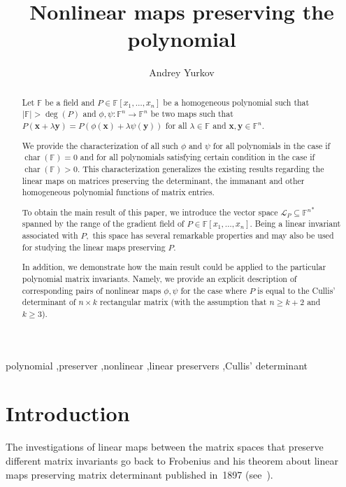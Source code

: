 \documentclass{elsarticle}
\DeclareMathOperator{\Char}{char}
\def\F{{\mathbb F}}
\theoremstyle{definition}
\numberwithin{equation}{section}
\begin{document}
\title{Nonlinear maps preserving the polynomial}
\author[1]{Andrey Yurkov}



%
\begin{abstract}
Let $\F$ be a field and $P \in \F[x_1,\ldots, x_n]$ be a homogeneous polynomial such that $|\F| > \deg(P)$ and $\phi, \psi\colon \F^n \to \F^n$ be two maps such that $P(\mathbf{x} + \lambda\mathbf{y}) = P(\phi(\mathbf{x}) + \lambda \psi (\mathbf{y}))$ for all $\lambda \in \F$ and $\mathbf{x}, \mathbf{y} \in \F^n.$

We provide the characterization of all such $\phi$ and $\psi$ for all polynomials in the case if $\Char(\F) = 0$ and for all polynomials satisfying certain condition in the case if $\Char(\F) > 0$. This characterization generalizes the existing results regarding the linear maps on matrices
preserving the determinant, the immanant and other homogeneous polynomial functions of matrix entries.

To obtain the main result of this paper, we introduce the vector space $\mathcal L_{P} \subseteq {\F^n}^*$ spanned by the range of the gradient field of $P \in \F[x_1,\ldots, x_n]$. Being a linear invariant associated with $P,$ this space has several remarkable properties and may also be used for studying the linear maps preserving $P$.

In addition, we demonstrate how the main result could be applied to the particular polynomial matrix invariants. Namely, we provide an explicit description of corresponding pairs of nonlinear maps $\phi, \psi$  for the case where $P$ is equal to the Cullis' determinant of $n\times k$ rectangular matrix (with the assumption that $n \ge k + 2$ and $k \ge 3$).
\end{abstract}

\begin{keyword}
polynomial \sep preserver \sep nonlinear \sep linear preservers \sep Cullis' determinant
\end{keyword}

\maketitle

\thispagestyle{empty}

\section{Introduction}
\label{sec:intro}
The investigations of linear maps between the matrix spaces that preserve different matrix invariants go back to Frobenius and his theorem about linear maps preserving matrix determinant published in~1897 (see~\cite{GF}). 
\end{document}
